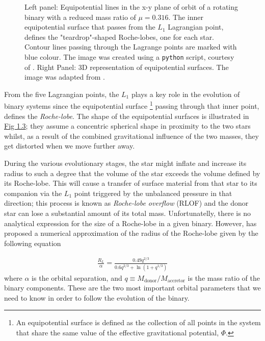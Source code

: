 \documentclass[../../main/thesis_msc.tex]{subfiles}
\begin{document}
\begin{figure}[h]
\begin{subfigure}[h]{0.45\textwidth}
   					 \end{subfigure}
   					 \caption{Left panel: Equipotential lines in the x-y plane of orbit of a rotating binary with a reduced mass ratio of $\mu = 0.316$. The inner equipotential surface that passes from the $L_1$ Lagrangian point, defines the "teardrop"-shaped Roche-lobes, one for each star. Contour lines passing through the Lagrange points are marked with blue colour. The image was created using a \texttt{python} script, courtesy of \cite{Zingale}. Right Panel: 3D representation of equipotential surfaces. The image was adapted from \cite{Sluijs}. }
   					 \label{fig:eq_sur}
				\end{figure}
				
				From the five Lagrangian points, the $L_1$ plays a key role in the evolution of binary systems since the equipotential surface \footnote{An equipotential surface is defined as the collection of all points in the system that share the same value of the effective gravitational potential, $\Phi$.} passing through that inner point, defines the \emph{Roche-lobe}. The shape of the equipotential surfaces is illustrated in \hyperref[fig:eq_sur]{Fig 1.3}; they assume a concentric spherical shape in proximity to the two stars whilst, as a result of the combined gravitational influence of the two masses, they get distorted when we move further away.
				
				During the various evolutionary stages, the star might inflate and increase its radius to such a degree that the volume of the star exceeds the volume defined by its Roche-lobe. This will cause a transfer of surface material from that star to its companion via the $L_1$ point triggered by the unbalanced pressure in that direction; this process is known as \emph{Roche-lobe overflow} (RLOF) and the donor star can lose a substantial amount of its total mass. Unfortunatelly, there is no analytical expression for the size of a Roche-lobe in a given binary. However, \cite{Eggleton1983} has proposed a numerical approximation of the radius of the Roche-lobe given by the following equation
				
				\begin{eqnarray}
					\label{eq:rl_radius}
					\frac{R_L}{\alpha} = \frac{0.49 q^{2/3}}{0.6 q^{2/3} + \ln(1 + q^{1/3})}
				\end{eqnarray}				 
				where $\alpha$ is the orbital separation, and $q \equiv M_{\text{donor}} / M_{\text{accretor}}$ is the mass ratio of the binary components. These are the two most important orbital parameters that we need to know in order to follow the evolution of the binary.
				
\end{document}
